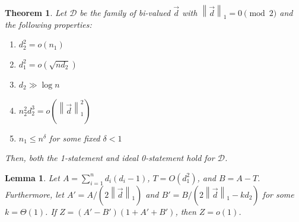 \documentclass[10pt,a4paper]{amsart}
\newtheorem{theorem}{Theorem}
\newtheorem{lemma}{Lemma}
\newcommand{\norm}[1]{\left\lVert #1 \right\rVert}
\begin{document}
\begin{theorem}
\label{theorem: G(n,d) bi-valued 0-statement}
      Let $\mathcal{D}$ be the family of bi-valued $\vec{d}$  with $\norm{\vec{d}}_1=0\pmod{2}$ and the following properties:
      \begin{enumerate}[label=(A\arabic*), leftmargin=3cm]
          \item $d_2^2 = o(n_1)$ \label{cond: d_2 and n_1 bound}
          \item $d_1^2 = o(\sqrt{n d_2})$ \label{cond: stronger d_1 bound}
          \item $d_2\gg\log n$ \label{cond: d_2 lower bound embedding}
          \item $n_2^2 d_2^3 = o(\norm{\vec{d}}_1^2)$ \label{cond: n_2 and d_2 bound with norm}
          \item $n_1\leq n^\delta$ for some fixed $\delta < 1$ \label{cond: n_1 small}
      \end{enumerate}
      Then, both the 1-statement and ideal 0-statement hold for $\mathcal{D}$.
\end{theorem}

\begin{lemma}
\label{lemma: G(n,d) 0-statement Intermediate Lemma}
Let $A = \sum\limits_{i = 1}^{n} d_i(d_i-1)$, $T= O(d_1^2)$, and $B = A - T$. Furthermore, let $A' = A/(2\norm{\vec{d}}_1)$ and $B' = B/(2\norm{\vec{d}}_1 - k d_2)$ for some $k = \Theta(1)$. If $Z = (A' - B')(1 + A' + B')$, then $Z = o(1)$.
\end{lemma}
\end{document}
